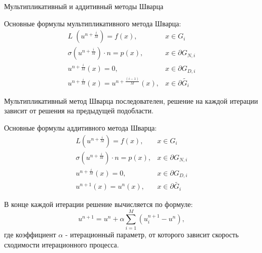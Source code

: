 \documentclass{beamer}
\begin{document}
\begin{frame}{Мультипликативный и аддитивный методы Шварца}
\footnotesize
\begin{multicols}{2}
Основные формулы мультипликативного метода Шварца:
\begin{equation*}
\begin{array}{ll}
L \; (u^{n+\frac{i}{M}}) = f(x), & x \in G_i \\
\sigma(u^{n+\frac{i}{M}}) \cdot n = p(x), & x \in \partial G_{N, i} \\
u^{n+\frac{i}{M}}(x) = 0, & x \in \partial G_{D, i} \\ 
u^{n+\frac{i}{M}}(x) = u^{n+\frac{(i - 1)}{M}}(x), & x \in \partial \tilde{G_i}
\end{array}
\end{equation*}

Мультипликативный метод Шварца последователен, решение на каждой итерации зависит от решения на предыдущей подобласти. 

\columnbreak

Основные формулы аддитивного метода Шварца:
\begin{equation*}
\begin{array}{rl}
L (u^{n+\frac{i}{M}}) = f(x), & x \in G_i \\
\sigma(u^{n+\frac{i}{M}}) \cdot n = p(x), & x \in \partial G_{N, i} \\
u^{n+\frac{i}{M}}(x) = 0, & x \in \partial G_{D, i} \\ 
u^{n+1}(x) = u^{n}(x), & x \in \partial \tilde{G_i}
\end{array}
\end{equation*}

В конце каждой итерации решение вычисляется по формуле:
\begin{equation*}
u^{n+1} = u^{n} + \alpha \sum_{i=1}^{M} (u_i^{n+1} - u^{n}),
\end{equation*}
где коэффициент $\alpha$ - итерационный параметр, от которого зависит скорость сходимости итерационного процесса. 
\end{multicols}
\end{frame}
\end{document}
